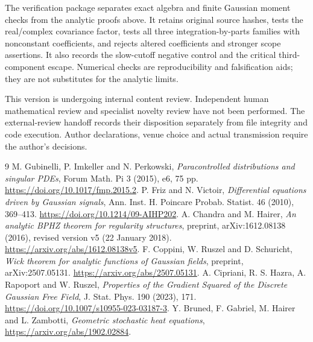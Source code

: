 \documentclass[11pt]{article}
\begin{document}
The verification package separates exact algebra and finite Gaussian moment
checks from the analytic proofs above. It retains original source hashes,
tests the real/complex covariance factor, tests all three integration-by-parts
families with nonconstant coefficients, and rejects altered coefficients and
stronger scope assertions. It also records the slow-cutoff negative control
and the critical third-component escape. Numerical checks are reproducibility
and falsification aids; they are not substitutes for the analytic limits.

This version is undergoing internal content review. Independent human
mathematical review and specialist novelty review have not been performed.
The external-review handoff records their disposition separately from file
integrity and code execution. Author declarations, venue choice and actual
transmission require the author's decisions.

\begin{thebibliography}{9}
 M. Gubinelli, P. Imkeller and N. Perkowski,
\emph{Paracontrolled distributions and singular PDEs}, Forum Math. Pi
3 (2015), e6, 75 pp. \url{https://doi.org/10.1017/fmp.2015.2}.
 P. Friz and N. Victoir,
\emph{Differential equations driven by Gaussian signals}, Ann. Inst. H.
Poincare Probab. Statist. 46 (2010), 369--413.
\url{https://doi.org/10.1214/09-AIHP202}.
 A. Chandra and M. Hairer,
\emph{An analytic BPHZ theorem for regularity structures}, preprint,
arXiv:1612.08138 (2016), revised version v5 (22 January 2018).
\url{https://arxiv.org/abs/1612.08138v5}.
 F. Coppini, W. Ruszel and D. Schuricht,
\emph{Wick theorem for analytic functions of Gaussian fields}, preprint,
arXiv:2507.05131. \url{https://arxiv.org/abs/2507.05131}.
 A. Cipriani, R. S. Hazra, A. Rapoport and W. Ruszel,
\emph{Properties of the Gradient Squared of the Discrete Gaussian Free Field},
J. Stat. Phys. 190 (2023), 171.
\url{https://doi.org/10.1007/s10955-023-03187-3}.
 Y. Bruned, F. Gabriel, M. Hairer and L. Zambotti,
\emph{Geometric stochastic heat equations},
\url{https://arxiv.org/abs/1902.02884}.
\end{thebibliography}
\end{document}
